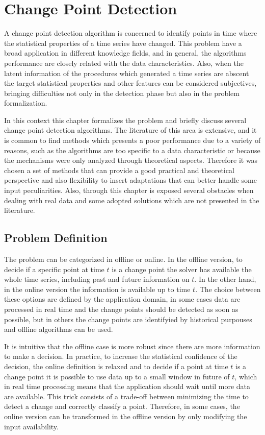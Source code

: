 \chapter{Change Point Detection} 

A change point detection algorithm is concerned to identify points in time where the statistical properties of a time series have changed. This problem have a broad application in different knowledge fields, and in general, the algorithms performance are closely related with the data characteristics. Also, when the latent information of the procedures which generated a time series are abscent the target statistical properties and other features can be considered subjectives, bringing difficulties not only in the detection phase but also in the problem formalization.

In this context this chapter formalizes the problem and briefly discuss several change point detection algorithms. The literature of this area is extensive, and it is common to find methods which presents a poor performance due to a variety of reasons, such as the algorithms are too specific to a data characteristic or because the mechanisms were only analyzed through theoretical aspects. Therefore it was chosen a set of methods that can provide a good practical and theoretical perspective and also flexibility to insert adaptations that can better handle some input peculiarities. Also, through this chapter is exposed several obstacles when dealing with real data and some adopted solutions which are not presented in the literature.

\section{Problem Definition}

The problem can be categorized in offline or online. In the offline version, to decide if a specific point at time $t$ is a change point the solver has available the whole time series, including past and future information on $t$. In the other hand, in the online version the information is available up to time $t$. The choice between these options are defined by the application domain, in some cases data are processed in real time and the change points should be detected as soon as possible, but in others the change points are identifyied by historical purpouses and offline algorithms can be used. 

It is intuitive that the offline case is more robust since there are more information to make a decision. In practice, to increase the statistical confidence of the decision, the online definition is relaxed and to decide if a point at time $t$ is a change point it is possible to use data up to a small window in future of $t$, which in real time processing means that the application should wait until more data are available. This trick consists of a trade-off between minimizing the time to detect a change and correctly classify a point. Therefore, in some cases, the online version can be transformed in the offline version by only modifying the input availability. 

